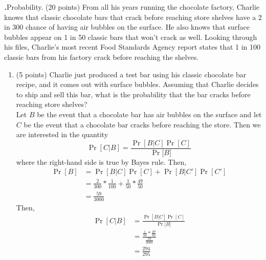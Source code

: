 \documentclass[12pt]{amsart}
\newenvironment{statement}[1]{\smallskip\noindent\color[rgb]{0.0,0.0,0.0} {\bf #1.}}{}
\theoremstyle{definition}
\theoremstyle{remark}
\newcommand{\1}{\mathds{1}}
\begin{document}
\begin{statement}{1}
\textit{Probability.} (20 points) From all his years running the chocolate factory, Charlie knows that classic chocolate bars that crack before reaching store shelves have a 2 in 300 chance of having air bubbles on the surface. He also knows that surface bubbles appear on 1 in 50 classic bars that won't crack as well. Looking through his files, Charlie's most recent Food Standards Agency report states that 1 in 100 classic bars from his factory crack before reaching the shelves.

\begin{enumerate}
    \item (5 points) Charlie just produced a test bar using his classic chocolate bar recipe, and it comes out with surface bubbles. Assuming that Charlie decides to ship and sell this bar, what is the probability that the bar cracks before reaching store shelves?
    \\ Let $B$ be the event that a chocolate bar has air bubbles on the surface and let $C$ be the event that a chocolate bar cracks before reaching the store. Then we are 
    interested in the quantity 
    $$
        \Pr{[C|B]} = \frac{\Pr{[B|C]}\Pr{[C]}}{\Pr{[B}]}
    $$
    where the right-hand side is true by Bayes rule. Then, 
    \begin{align*}
        \Pr{[B]} &= \Pr{[B|C]}\Pr{[C]} + \Pr{[B|C']}\Pr{[C']} \\ 
        &= \frac{2}{300}*\frac{1}{100} + \frac{1}{50}*\frac{49}{50}\\ 
        &= \frac{59}{3000}
    \end{align*}
    Then, 
    \begin{align*}
        \Pr{[C|B]} &= \frac{\Pr{[B|C]}\Pr{[C]}}{\Pr{[B}]} \\
        &= \frac{\frac{1}{50}* \frac{49}{50}}{\frac{59}{3000}} \\ 
        &= \frac{294}{295}
    \end{align*}


\end{enumerate}
\end{statement}
\end{document}
